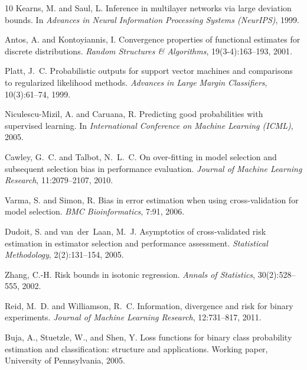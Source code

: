 \documentclass[11pt,a4paper]{article}
\theoremstyle{definition}
\begin{document}
\begin{thebibliography}{10}
Kearns, M. and Saul, L.
\newblock Inference in multilayer networks via large deviation bounds.
\newblock In \emph{Advances in Neural Information Processing Systems (NeurIPS)}, 1999.

Antos, A. and Kontoyiannis, I.
\newblock Convergence properties of functional estimates for discrete distributions.
\newblock \emph{Random Structures \& Algorithms}, 19(3-4):163--193, 2001.

Platt, J.~C.
\newblock Probabilistic outputs for support vector machines and comparisons to regularized likelihood methods.
\newblock \emph{Advances in Large Margin Classifiers}, 10(3):61--74, 1999.

Niculescu-Mizil, A. and Caruana, R.
\newblock Predicting good probabilities with supervised learning.
\newblock In \emph{International Conference on Machine Learning (ICML)}, 2005.

Cawley, G.~C. and Talbot, N.~L.~C.
\newblock On over-fitting in model selection and subsequent selection bias in performance evaluation.
\newblock \emph{Journal of Machine Learning Research}, 11:2079--2107, 2010.

Varma, S. and Simon, R.
\newblock Bias in error estimation when using cross-validation for model selection.
\newblock \emph{BMC Bioinformatics}, 7:91, 2006.

Dudoit, S. and van~der~Laan, M.~J.
\newblock Asymptotics of cross-validated risk estimation in estimator selection and performance assessment.
\newblock \emph{Statistical Methodology}, 2(2):131--154, 2005.

Zhang, C.-H.
\newblock Risk bounds in isotonic regression.
\newblock \emph{Annals of Statistics}, 30(2):528--555, 2002.

Reid, M.~D. and Williamson, R.~C.
\newblock Information, divergence and risk for binary experiments.
\newblock \emph{Journal of Machine Learning Research}, 12:731--817, 2011.

Buja, A., Stuetzle, W., and Shen, Y.
\newblock Loss functions for binary class probability estimation and classification: structure and applications.
\newblock Working paper, University of Pennsylvania, 2005.


\end{thebibliography}
\end{document}
